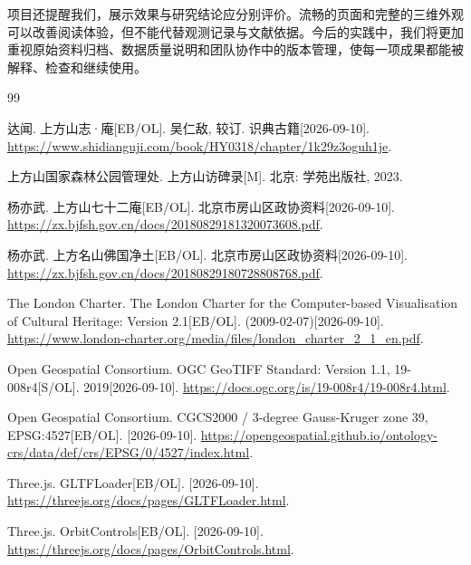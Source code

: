 \documentclass[UTF8,a4paper,zihao=-4]{ctexart}
\begin{document}
项目还提醒我们，展示效果与研究结论应分别评价。流畅的页面和完整的三维外观可以改善阅读体验，但不能代替观测记录与文献依据。今后的实践中，我们将更加重视原始资料归档、数据质量说明和团队协作中的版本管理，使每一项成果都能被解释、检查和继续使用。


\clearpage{}\begin{thebibliography}{99}

达闻. 上方山志·庵[EB/OL]. 吴仁敌, 较订. 识典古籍[2026-09-10]. \url{https://www.shidianguji.com/book/HY0318/chapter/1k29z3oguh1je}.

上方山国家森林公园管理处. 上方山访碑录[M]. 北京: 学苑出版社, 2023.

杨亦武. 上方山七十二庵[EB/OL]. 北京市房山区政协资料[2026-09-10]. \url{https://zx.bjfsh.gov.cn/docs/20180829181320073608.pdf}.

杨亦武. 上方名山佛国净土[EB/OL]. 北京市房山区政协资料[2026-09-10]. \url{https://zx.bjfsh.gov.cn/docs/20180829180728808768.pdf}.

The London Charter. The London Charter for the Computer-based Visualisation of Cultural Heritage: Version 2.1[EB/OL]. (2009-02-07)[2026-09-10]. \url{https://www.london-charter.org/media/files/london_charter_2_1_en.pdf}.

Open Geospatial Consortium. OGC GeoTIFF Standard: Version 1.1, 19-008r4[S/OL]. 2019[2026-09-10]. \url{https://docs.ogc.org/is/19-008r4/19-008r4.html}.

Open Geospatial Consortium. CGCS2000 / 3-degree Gauss-Kruger zone 39, EPSG:4527[EB/OL]. [2026-09-10]. \url{https://opengeospatial.github.io/ontology-crs/data/def/crs/EPSG/0/4527/index.html}.

Three.js. GLTFLoader[EB/OL]. [2026-09-10]. \url{https://threejs.org/docs/pages/GLTFLoader.html}.

Three.js. OrbitControls[EB/OL]. [2026-09-10]. \url{https://threejs.org/docs/pages/OrbitControls.html}.

\end{thebibliography}
\end{document}
